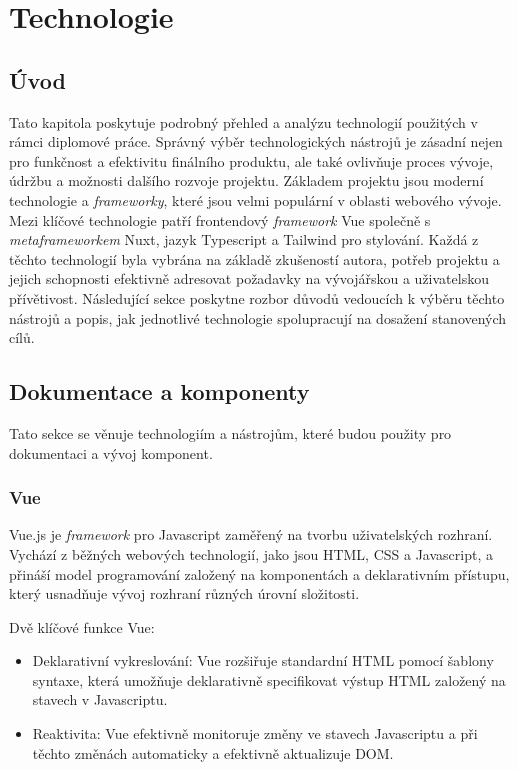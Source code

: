 
\chapter{Technologie}
\label{chap:technologie}

\section{Úvod}
Tato kapitola poskytuje podrobný přehled a analýzu technologií použitých v rámci diplomové práce. Správný výběr technologických nástrojů je zásadní nejen pro funkčnost a efektivitu finálního produktu, ale také ovlivňuje proces vývoje, údržbu a možnosti dalšího rozvoje projektu. Základem projektu jsou moderní technologie a \emph{frameworky}, které jsou velmi populární v oblasti webového vývoje. Mezi klíčové technologie patří frontendový \emph{framework} Vue společně s \emph{metaframeworkem} Nuxt, jazyk Typescript a Tailwind pro stylování. Každá z těchto technologií byla vybrána na základě zkušeností autora, potřeb projektu a jejich schopnosti efektivně adresovat požadavky na vývojářskou a uživatelskou přívětivost. Následující sekce poskytne rozbor důvodů vedoucích k výběru těchto nástrojů a popis, jak jednotlivé technologie spolupracují na dosažení stanovených cílů.

\section{Dokumentace a komponenty}
Tato sekce se věnuje technologiím a nástrojům, které budou použity pro dokumentaci a vývoj komponent.

\subsection{Vue}
Vue.js je \emph{framework} pro Javascript zaměřený na tvorbu uživatelských rozhraní. Vychází z běžných webových technologií, jako jsou HTML, CSS a Javascript, a přináší model programování založený na komponentách a deklarativním přístupu, který usnadňuje vývoj rozhraní různých úrovní složitosti.

Dvě klíčové funkce Vue:

\begin{itemize}
  \item Deklarativní vykreslování: Vue rozšiřuje standardní HTML pomocí šablony syntaxe, která umožňuje deklarativně specifikovat výstup HTML založený na stavech v Javascriptu.
  \item Reaktivita: Vue efektivně monitoruje změny ve stavech Javascriptu a při těchto změnách automaticky a efektivně aktualizuje DOM. \cite{WhatIsVue}
\end{itemize}

